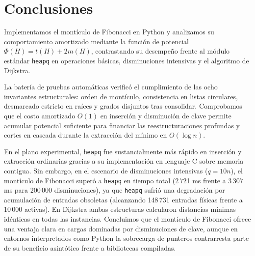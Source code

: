 \section{Conclusiones}

Implementamos el montículo de Fibonacci en Python y analizamos su comportamiento amortizado mediante la función de potencial $\Phi(H) = t(H) + 2m(H)$, contrastando su desempeño frente al módulo estándar \texttt{heapq} en operaciones básicas, disminuciones intensivas y el algoritmo de Dijkstra.

La batería de pruebas automáticas verificó el cumplimiento de las ocho invariantes estructurales: orden de montículo, consistencia en listas circulares, desmarcado estricto en raíces y grados disjuntos tras consolidar. Comprobamos que el costo amortizado $O(1)$ en inserción y disminución de clave permite acumular potencial suficiente para financiar las reestructuraciones profundas y cortes en cascada durante la extracción del mínimo en $O(\log n)$.

En el plano experimental, \texttt{heapq} fue sustancialmente más rápido en inserción y extracción ordinarias gracias a su implementación en lenguaje C sobre memoria contigua. Sin embargo, en el escenario de disminuciones intensivas ($q = 10n$), el montículo de Fibonacci superó a \texttt{heapq} en tiempo total (2\,721 ms frente a 3\,307 ms para 200\,000 disminuciones), ya que \texttt{heapq} sufrió una degradación por acumulación de entradas obsoletas (alcanzando 148\,731 entradas físicas frente a 10\,000 activas). En Dijkstra ambas estructuras calcularon distancias mínimas idénticas en todas las instancias. Concluimos que el montículo de Fibonacci ofrece una ventaja clara en cargas dominadas por disminuciones de clave, aunque en entornos interpretados como Python la sobrecarga de punteros contrarresta parte de su beneficio asintótico frente a bibliotecas compiladas.
